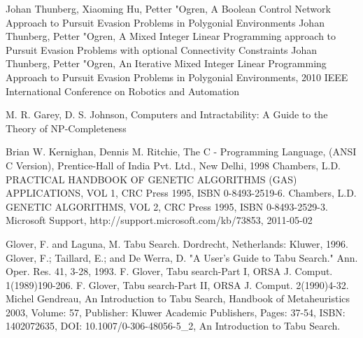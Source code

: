 \begin{thebibliography}{99}
  Johan Thunberg, Xiaoming Hu, Petter "Ogren, A Boolean Control Network Approach to Pursuit Evasion Problems in Polygonial Environments
 Johan Thunberg, Petter "Ogren, A Mixed Integer Linear Programming approach to Pursuit Evasion Problems with optional Connectivity Constraints
 Johan Thunberg, Petter "Ogren, An Iterative Mixed Integer Linear Programming Approach to Pursuit Evasion Problems in Polygonial Environments, 2010 IEEE International Conference on Robotics and Automation

 M. R. Garey, D. S. Johnson, Computers and Intractability: A Guide to the Theory of NP-Completeness

 Brian W. Kernighan, Dennis M. Ritchie, The C - Programming Language, (ANSI C Version), Prentice-Hall of India Pvt. Ltd., New Delhi, 1998
 Chambers, L.D. PRACTICAL HANDBOOK OF GENETIC ALGORITHMS (GAS) APPLICATIONS, VOL 1, CRC Press 1995, ISBN 0-8493-2519-6.
 Chambers, L.D. GENETIC ALGORITHMS, VOL 2, CRC Press 1995, ISBN 0-8493-2529-3.
 Microsoft Support, http://support.microsoft.com/kb/73853, 2011-05-02


  Glover, F. and Laguna, M. Tabu Search. Dordrecht, Netherlands: Kluwer, 1996.
  Glover, F.; Taillard, E.; and De Werra, D. "A User's Guide to Tabu Search." Ann. Oper. Res. 41, 3-28, 1993.
 F. Glover, Tabu search-Part I, ORSA J. Comput. 1(1989)190-206.
 F. Glover, Tabu search-Part II, ORSA J. Comput. 2(1990)4-32.
 Michel Gendreau, An Introduction to Tabu Search, Handbook of Metaheuristics 2003, Volume: 57, Publisher: Kluwer Academic Publishers, Pages: 37-54, ISBN: 1402072635, DOI: 10.1007/0-306-48056-5\_2, An Introduction to Tabu Search.


\end{thebibliography}
